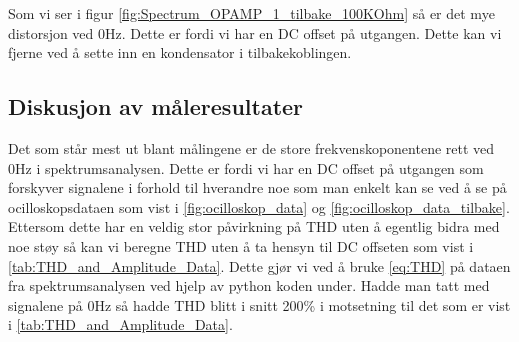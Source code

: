 Som vi ser i figur \autoref{fig:Spectrum_OPAMP_1_tilbake_100KOhm} så er det mye distorsjon ved 0Hz. Dette er fordi vi har en DC offset på utgangen. Dette kan vi fjerne ved å sette inn en kondensator i tilbakekoblingen. 

\subsection{Diskusjon av måleresultater}
\label{diskusjon}
Det som står mest ut blant målingene er de store frekvenskoponentene rett ved 0Hz i spektrumsanalysen. Dette er fordi vi har en DC offset på utgangen som forskyver signalene i forhold til hverandre noe som man enkelt kan se ved å se på ocilloskopsdataen som vist i \autoref{fig:ocilloskop_data} og \autoref{fig:ocilloskop_data_tilbake}. Ettersom dette har en veldig stor påvirkning på THD uten å egentlig bidra med noe støy så kan vi beregne THD uten å ta hensyn til DC offseten som vist i \autoref{tab:THD_and_Amplitude_Data}. Dette gjør vi ved å bruke \autoref{eq:THD} på dataen fra spektrumsanalysen ved hjelp av python koden under. Hadde man tatt med signalene på 0Hz så hadde THD blitt i snitt 200\% i motsetning til det som er vist i \autoref{tab:THD_and_Amplitude_Data}. 

